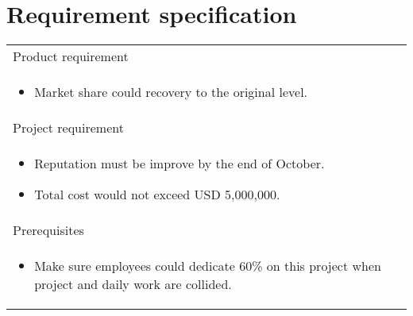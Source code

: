 \documentclass{report}
\begin{document}
\chapter{Requirement specification}
\begin{table}[h]
\begin{tabular}{| p{12cm} |}
	\hline
	Product requirement \\
	\begin{itemize}
	\item
	Market share could recovery to the original level.
	\end{itemize}
	\\

	\hline
	Project requirement \\
	\begin{itemize}
	\item
	Reputation must be improve by the end of October.
	\item
	Total cost would not exceed USD 5,000,000.
	\end{itemize}
	\\
	\hline
	Prerequisites \\
	\begin{itemize}
	\item
	Make sure employees could dedicate 60\% on this project when project and daily work are collided.
	\end{itemize}
	\\
	\hline
\end{tabular}
\end{table}
\end{document}
